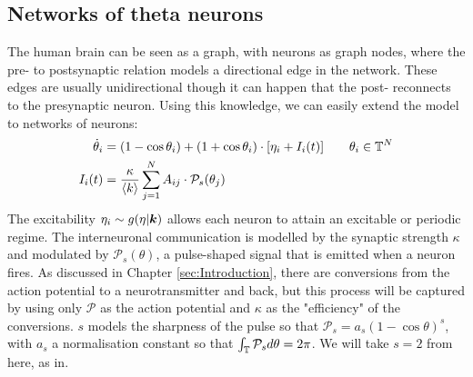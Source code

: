 


\subsection{Networks of theta neurons}
The human brain can be seen as a graph, with neurons as graph nodes, where the pre- to postsynaptic relation models a directional edge in the network. These edges are usually unidirectional though it can happen that the post- reconnects to the presynaptic neuron. Using this knowledge, we can easily extend the model to networks of neurons:
\begin{align}
\dot{\theta}_{i} &=\left(1-\cos \theta_{i}\right)+\left(1+\cos \theta_{i}\right) \cdot \left[\eta_{i} + I_{i}(t)\right] \qquad \theta_i \in \T^N  \label{eq:thetaneuronnetwork} \\
I_{i}(t) &=\frac{\kappa}{\kmean} \sum_{j=1}^{N} A_{i j} \cdot \mathcal{P}_{s}(\theta_{j}) \label{eq:thetaneuronnetworkcurrent}
\end{align}
The excitability $\eta_i \sim g(\eta \rvert {\boldsymbol{k}})$ allows each neuron to attain an excitable or periodic regime. The interneuronal communication is modelled by the synaptic strength $\kappa$ and modulated by $\mathcal{P}_s(\theta)$, a pulse-shaped signal that is emitted when a neuron fires. As discussed in Chapter \ref{sec:Introduction}, there are conversions from the action potential to a neurotransmitter and back, but this process will be captured by using only $\mathcal{P}$ as the action potential and $\kappa$ as the "efficiency" of the conversions. $s$ models the sharpness of the pulse so that $\mathcal{P}_s = a_s(1 - \cos \theta)^s$, with $a_s$ a normalisation constant so that $\int_{{\mathbb{T}}} \mathcal{P}_{s} d \theta=2 \pi$. We will take $s=2$ from here, as in\cite{Luke2013, OttAntonsen2017, Martens2020}. 

